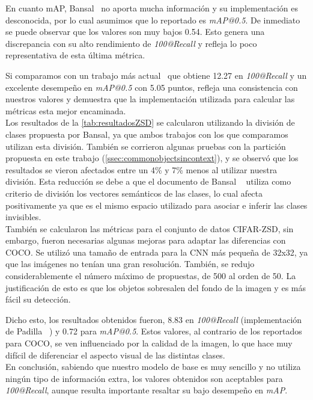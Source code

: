 En cuanto mAP, Bansal\etal~\cite{bansal2018zero} no aporta mucha información y su implementación es desconocida, por lo cual asumimos que lo reportado es \textit{mAP@0.5}. De inmediato se puede observar que los valores son muy bajos 0.54. Esto genera una discrepancia con su alto rendimiento de \textit{100@Recall} y refleja lo poco representativa de esta última métrica. 

Si comparamos con un trabajo más actual~\cite{rahman2020zero} que obtiene 12.27 en \textit{100@Recall} y un excelente desempeño en \textit{mAP@0.5} con 5.05 puntos, refleja una consistencia con nuestros valores y demuestra que la implementación utilizada para calcular las métricas esta mejor encaminada.\\


Los resultados de la \autoref{tab:resultadosZSD} se calcularon utilizando la división de clases propuesta por Bansal, ya que ambos trabajos con los que comparamos utilizan esta división. También se corrieron algunas pruebas con la partición propuesta en este trabajo (\autoref{ssec:commonobjectsincontext}), y se observó que los resultados se vieron afectados entre un 4\% y 7\% menos al utilizar nuestra división. Esta reducción se debe a que el documento de Bansal \etal~\cite{bansal2018zero} utiliza como criterio de división los vectores semánticos de las clases, lo cual afecta positivamente ya que es el mismo espacio utilizado para asociar e inferir las clases invisibles.\\

También se calcularon las métricas para el conjunto de datos CIFAR-ZSD, sin embargo, fueron necesarias algunas mejoras para adaptar las diferencias con COCO. Se utilizó una tamaño de entrada para la CNN más pequeña de 32x32, ya que las imágenes no tenían una gran resolución. También, se redujo considerablemente el número máximo de propuestas, de 500 al orden de 50. La justificación de esto es que los objetos sobresalen del fondo de la imagen y es más fácil su detección.

Dicho esto, los resultados obtenidos fueron, 8.83 en \textit{100@Recall} (implementación de Padilla \etal~\cite{padilla2020survey}) y 0.72 para \textit{mAP@0.5}. Estos valores, al contrario de los reportados para COCO, se ven influenciado por la calidad de la imagen, lo que hace muy difícil de diferenciar el aspecto visual de las distintas clases.\\

En conclusión, sabiendo que nuestro modelo de base es muy sencillo y no utiliza ningún tipo de información extra, los valores obtenidos son aceptables para \textit{100@Recall}, aunque resulta importante resaltar su bajo desempeño en \textit{mAP}. 

